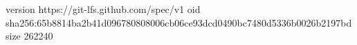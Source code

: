 version https://git-lfs.github.com/spec/v1
oid sha256:65b8814ba2b41d096780808006cb06ce93dcd0490bc7480d5336b0026b2197bd
size 262240

